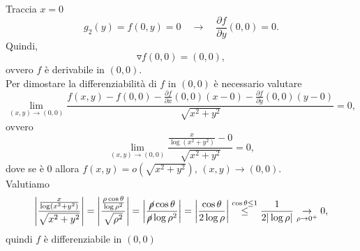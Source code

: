 \begin{example}
\begin{equation*}
	\end{equation*}
	Traccia $x=0$
	\begin{equation*}
		g_2(y) = f(0,y) = 0 \quad\rightarrow\quad \frac{\partial f}{\partial y}(0,0) = 0.
	\end{equation*}
	Quindi,
	\begin{equation*}
		\triangledown f(0,0) = (0,0),
	\end{equation*}
	ovvero $f$ è derivabile in $(0,0)$.\\
	Per dimostare la differenziabilità di $f$ in $(0,0)$ è necessario valutare
	\begin{equation*}
		\lim_{(x,y)\rightarrow(0,0)}\frac{f(x,y)-f(0,0)-\frac{\partial f}{\partial x}(0,0)(x-0)-\frac{\partial f}{\partial y}(0,0)(y-0)}{\sqrt{x^2+y^2}}=0,
	\end{equation*}
	ovvero
	\begin{equation*}
		\lim_{(x,y)\rightarrow(0,0)}\frac{\frac{x}{\log(x^2+y^2)}-0}{\sqrt{x^2+y^2}}=0,
	\end{equation*}
	dove se è $0$ allora $f(x,y)=o\left(\sqrt{x^2+y^2}\right),\, (x,y)\rightarrow (0,0)$.\\
	Valutiamo
	\begin{equation*}
		\left|\frac{\frac{x}{\log(x^2+y^2)}}{\sqrt{x^2+y^2}}\right|=\left|\frac{\frac{\rho\cos\theta}{\log\rho^2}}{\sqrt{\rho^2}}\right| = \left|\frac{\cancel{\rho}\cos\theta}{\cancel{\rho}\log\rho^2}\right| = \left|\frac{\cos\theta}{2\log\rho}\right|\overset{\cos\theta \leq 1}{\leq} \frac{1}{2|\log\rho|}\underset{\rho\rightarrow 0^+}{\rightarrow}0,
	\end{equation*}
	quindi $f$ è differenziabile in $(0,0)$
\end{example}
